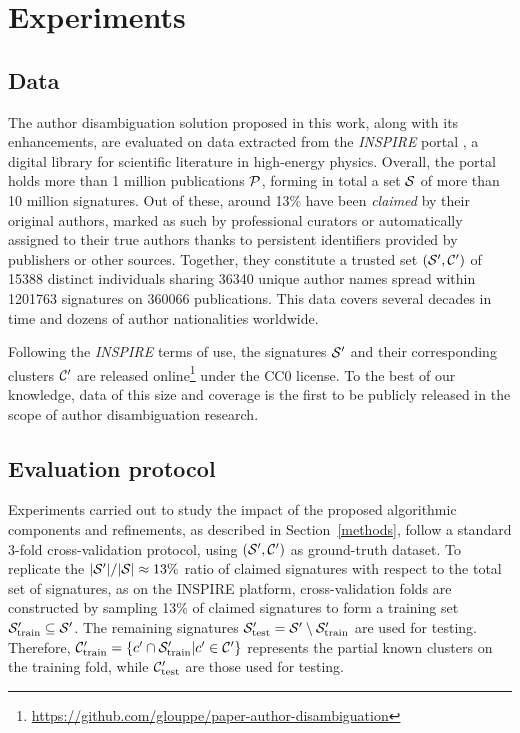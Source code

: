 \documentclass[conference]{IEEEtran}
\begin{document}

\section{Experiments}
\label{experiments}

\subsection{Data}

The author disambiguation solution proposed in this work, along with its
enhancements, are evaluated on data extracted from the \emph{INSPIRE} portal
\cite{gentil2009information}, a digital library for scientific literature in
high-energy physics.
Overall, the portal holds more than 1 million publications ${\cal P}$,
forming in total a set ${\cal S}$ of more than 10 million signatures.
Out of these, around 13\% have been \textit{claimed} by their
original authors, marked as such by professional curators or automatically assigned to their true authors thanks
to persistent identifiers provided by publishers or other sources.
Together, they constitute a trusted set $({\cal S}^\prime, {\cal C}^\prime)$ of 15388 distinct individuals sharing
36340 unique author names spread within 1201763 signatures on 360066
publications. This data covers several decades in time and dozens of author
nationalities worldwide.

Following the \emph{INSPIRE} terms of use, the signatures ${\cal S}^\prime$ and their
corresponding clusters ${\cal C}^\prime$ are released
online\footnote{\url{https://github.com/glouppe/paper-author-disambiguation}}
under the CC0 license.
To the best of our knowledge, data of this size and coverage is the first to be publicly
released in the scope of author disambiguation research.

\subsection{Evaluation protocol}

Experiments carried out to study the impact of the proposed algorithmic
components and refinements, as described in Section~\ref{methods}, follow a
standard 3-fold cross-validation protocol, using $({\cal S}^\prime, {\cal
C}^\prime)$ as ground-truth dataset. To replicate the $|{\cal S}^\prime| /
|{\cal S}| \approx 13\%$ ratio of claimed signatures with respect to the total
set of signatures, as on the INSPIRE platform, cross-validation folds are
constructed by sampling 13\% of claimed signatures to form a training set ${\cal
S}_\text{train}^\prime \subseteq {\cal S}^\prime$.
The remaining signatures ${\cal S}_\text{test}^\prime = {\cal S}^\prime \setminus {\cal
S}_\text{train}^\prime$ are used for testing.
Therefore, ${\cal C}_\text{train}^\prime = \{ c^\prime \cap {\cal S}_\text{train}^\prime | c^\prime \in {\cal C}^\prime
\}$ represents the partial known clusters on the training fold, while ${\cal
C}_\text{test}^\prime$ are those used for testing.
\end{document}
